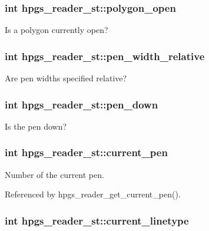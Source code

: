 \subsubsection[polygon\_\-open]{\setlength{\rightskip}{0pt plus 5cm}int {\bf hpgs\_\-reader\_\-st::polygon\_\-open}}\label{structhpgs__reader__st_b84b4fe7de340a06ba16d07b9a1f7387}


Is a polygon currently open? 
\subsubsection[pen\_\-width\_\-relative]{\setlength{\rightskip}{0pt plus 5cm}int {\bf hpgs\_\-reader\_\-st::pen\_\-width\_\-relative}}\label{structhpgs__reader__st_383155685b823031c197d401e9da4519}


Are pen widths specified relative? 
\subsubsection[pen\_\-down]{\setlength{\rightskip}{0pt plus 5cm}int {\bf hpgs\_\-reader\_\-st::pen\_\-down}}\label{structhpgs__reader__st_9f2449aee3d9f7e7faad17bd61918567}


Is the pen down? 
\subsubsection[current\_\-pen]{\setlength{\rightskip}{0pt plus 5cm}int {\bf hpgs\_\-reader\_\-st::current\_\-pen}}\label{structhpgs__reader__st_92993b1ad64e3231a76a573a98034425}


Number of the current pen. 

Referenced by hpgs\_\-reader\_\-get\_\-current\_\-pen().
\subsubsection[current\_\-linetype]{\setlength{\rightskip}{0pt plus 5cm}int {\bf hpgs\_\-reader\_\-st::current\_\-linetype}}\label{structhpgs__reader__st_7bae59709584e09da7a60cb2a86ef1f7}


